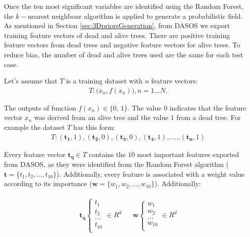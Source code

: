 \documentclass{subfiles}
\begin{document}
\par Once the ten most significant variables are identified using the Random Forest, the $k-$nearest neighbour algorithm is applied to generate a probabilistic field. As mentioned in Section \ref{sec:3DpriorsGeneration}, from DASOS we export training feature vectors of dead and alive trees. There are positive training feature vectors from dead trees and negative feature vectors for alive trees. To reduce bias, the number of dead and alive trees used are the same for each test case. 

\par Let’s assume that  $T$ is a training dataset with $n$ feature vectors:
\begin{eqnarray}
T  : \big(x_n, f(x_n) \big), n=1\dots N. 
\end{eqnarray}

The outputs of function $f(x_n) \in \{\textrm{0, 1} \}$. The value $0$ indicates that the feature vector $x_n$ was derived from an alive tree and the value $1$ from a dead tree. For example the dataset $T$ has this form:
\begin{eqnarray}
T : (\boldsymbol{t_1}, 1), (\boldsymbol{t_2}, 0), (\boldsymbol{t_3}, 0), (\boldsymbol{t_4}, 1) . ...... (\boldsymbol{t_n}, 1)
\end{eqnarray}

\par Every feature vector  $\boldsymbol{t_q} \in T$ contains the $10$ most important features exported from DASOS, as they were identified from the Random Forest algorithm ($\boldsymbol{t}=\{t_1, t_2, \dots , t_{10}\}$). Additionally, every feature is associated with a weight value according to its importance ($\boldsymbol{w}=\{w_1,w_2, \dots ,w_{10} \} $). Additionally:


\begin{gather*}
\begin{align}
\boldsymbol{t_q} 
\begin{cases}
t_1\\    
t_2\\
\dots \\
t_{10} \\ 
\end{cases}
\in R^d &  & \boldsymbol{w}
\begin{cases}
w_1\\    
w_2\\
\dots \\
w_{10} \\    
\end{cases}
\in R^d 
\end{align}
\end{gather*}
\end{document}
